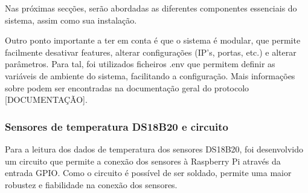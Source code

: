 Nas próximas secções, serão abordadas as diferentes componentes essenciais do sistema, assim
como sua instalação.

Outro ponto importante a ter em conta é que o sistema é modular, que permite facilmente desativar
features, alterar configurações (IP's, portas, etc.) e alterar parâmetros. Para tal, foi utilizados
ficheiros .env que permitem definir as variáveis de ambiente do sistema, facilitando a configuração.
Mais informações sobre podem ser encontradas na documentação geral do protocolo [DOCUMENTAÇÃO].

\subsubsection{Sensores de temperatura DS18B20 e circuito}

Para a leitura dos dados de temperatura dos sensores DS18B20, foi desenvolvido um circuito que permite a 
conexão dos sensores à Raspberry Pi através da entrada GPIO. Como o circuito é possível de ser 
soldado, permite uma maior robustez e fiabilidade na conexão dos sensores.

